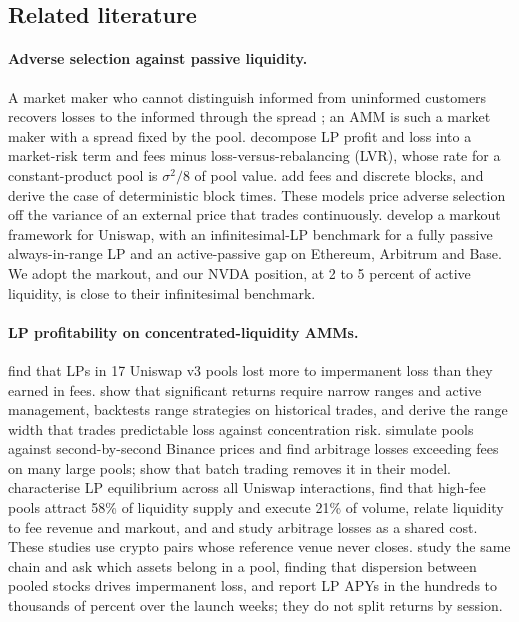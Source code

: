 \documentclass[11pt]{article}
\begin{document}
\subsection{Related literature}\label{sec:lit}

\paragraph{Adverse selection against passive liquidity.} A market maker who cannot distinguish informed from uninformed customers recovers losses to the informed through the spread \citep{glosten1985bid}; an AMM is such a market maker with a spread fixed by the pool. \citet{milionis2022lvr} decompose LP profit and loss into a market-risk term and fees minus loss-versus-rebalancing (LVR), whose rate for a constant-product pool is $\sigma^2/8$ of pool value. \citet{milionis2025fees} add fees and discrete blocks, and \citet{nezlobin2025lvr} derive the case of deterministic block times. These models price adverse selection off the variance of an external price that trades continuously. \citet{sadeghi2026active} develop a markout framework for Uniswap, with an infinitesimal-LP benchmark for a fully passive always-in-range LP and an active-passive gap on Ethereum, Arbitrum and Base. We adopt the markout, and our NVDA position, at 2 to 5 percent of active liquidity, is close to their infinitesimal benchmark.

\paragraph{LP profitability on concentrated-liquidity AMMs.} \citet{loesch2021impermanent} find that LPs in 17 Uniswap v3 pools lost more to impermanent loss than they earned in fees. \citet{heimbach2022risks} show that significant returns require narrow ranges and active management, \citet{fritsch2021concentrated} backtests range strategies on historical trades, and \citet{cartea2023predictable} derive the range width that trades predictable loss against concentration risk. \citet{fritsch2024measuring} simulate pools against second-by-second Binance prices and find arbitrage losses exceeding fees on many large pools; \citet{canidio2023batch} show that batch trading removes it in their model. \citet{lehar2025uniswap} characterise LP equilibrium across all Uniswap interactions, \citet{lehar2023fragmentation} find that high-fee pools attract 58\% of liquidity supply and execute 21\% of volume, \citet{zhu2024drives} relate liquidity to fee revenue and markout, and \citet{capponi2025liquidity} and \citet{capponi2021adoption} study arbitrage losses as a shared cost. These studies use crypto pairs whose reference venue never closes. \citet{galaxy2026bivalent} study the same chain and ask which assets belong in a pool, finding that dispersion between pooled stocks drives impermanent loss, and report LP APYs in the hundreds to thousands of percent over the launch weeks; they do not split returns by session.
\end{document}
